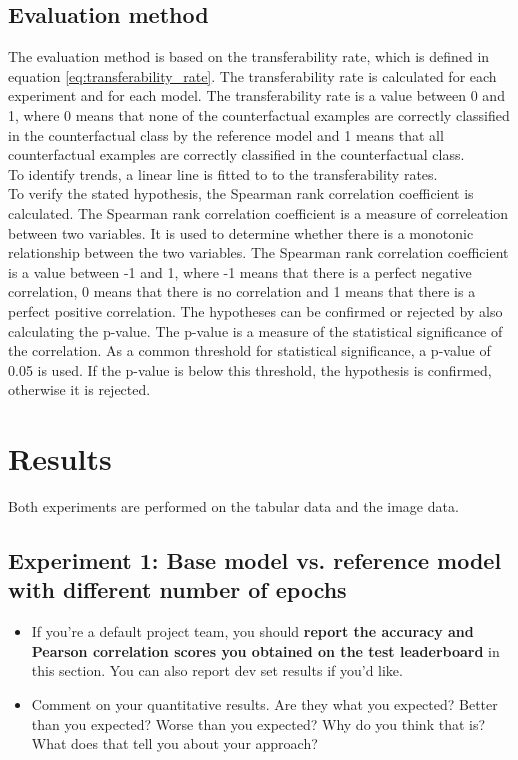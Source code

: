 \documentclass{article}
\begin{document}
\subsection{Evaluation method}
The evaluation method is based on the transferability rate, which is defined in equation \ref{eq:transferability_rate}. The transferability rate is calculated for each experiment and for each model. The transferability rate is a value between 0 and 1, where 0 means that none of the counterfactual examples are correctly classified in the counterfactual class by the reference model and 1 means that all counterfactual examples are correctly classified in the counterfactual class. \\
To identify trends, a linear line is fitted to to the transferability rates. \\
To verify the stated hypothesis, the Spearman rank correlation coefficient is calculated. The Spearman rank correlation coefficient is a measure of correleation between two variables. It is used to determine whether there is a monotonic relationship between the two variables. The Spearman rank correlation coefficient is a value between -1 and 1, where -1 means that there is a perfect negative correlation, 0 means that there is no correlation and 1 means that there is a perfect positive correlation. The hypotheses can be confirmed or rejected by also calculating the p-value. The p-value is a measure of the statistical significance of the correlation. As a common threshold for statistical significance, a p-value of 0.05 is used. If the p-value is below this threshold, the hypothesis is confirmed, otherwise it is rejected. \cite{spearman_rank_correlation}\\

\section{Results}
Both experiments are performed on the tabular data and the image data.
\subsection{Experiment 1: Base model vs. reference model with different number of epochs}



\begin{itemize}
    \item If you're a default project team, you should \textbf{report the accuracy and Pearson correlation scores you obtained on the test leaderboard} in this section. You can also report dev set results if you'd like. 
    \item Comment on your quantitative results. Are they what you expected? Better than you expected? Worse than you expected? Why do you think that is? What does that tell you about your approach?
\end{itemize}
\end{document}
